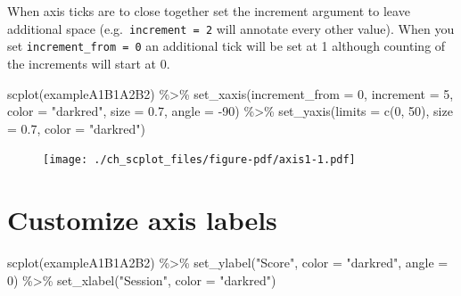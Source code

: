 \documentclass[
  letterpaper,
  DIV=11,
  numbers=noendperiod]{scrreprt}
\newenvironment{Shaded}{\begin{snugshade}}{\end{snugshade}}
\newcommand{\AttributeTok}[1]{\textcolor[rgb]{0.40,0.45,0.13}{#1}}
\newcommand{\DecValTok}[1]{\textcolor[rgb]{0.68,0.00,0.00}{#1}}
\newcommand{\FloatTok}[1]{\textcolor[rgb]{0.68,0.00,0.00}{#1}}
\newcommand{\FunctionTok}[1]{\textcolor[rgb]{0.28,0.35,0.67}{#1}}
\newcommand{\NormalTok}[1]{\textcolor[rgb]{0.00,0.23,0.31}{#1}}
\newcommand{\SpecialCharTok}[1]{\textcolor[rgb]{0.37,0.37,0.37}{#1}}
\newcommand{\StringTok}[1]{\textcolor[rgb]{0.13,0.47,0.30}{#1}}
\begin{document}
When axis ticks are to close together set the increment argument to
leave additional space (e.g.~\texttt{increment\ =\ 2} will annotate
every other value). When you set \texttt{increment\_from\ =\ 0} an
additional tick will be set at 1 although counting of the increments
will start at 0.

\begin{Shaded}
\begin{Highlighting}[]
\FunctionTok{scplot}\NormalTok{(exampleA1B1A2B2) }\SpecialCharTok{\%\textgreater{}\%} 
  \FunctionTok{set\_xaxis}\NormalTok{(}\AttributeTok{increment\_from =} \DecValTok{0}\NormalTok{, }\AttributeTok{increment =} \DecValTok{5}\NormalTok{, }
            \AttributeTok{color =} \StringTok{"darkred"}\NormalTok{, }\AttributeTok{size =} \FloatTok{0.7}\NormalTok{, }\AttributeTok{angle =} \SpecialCharTok{{-}}\DecValTok{90}\NormalTok{) }\SpecialCharTok{\%\textgreater{}\%}
  \FunctionTok{set\_yaxis}\NormalTok{(}\AttributeTok{limits =} \FunctionTok{c}\NormalTok{(}\DecValTok{0}\NormalTok{, }\DecValTok{50}\NormalTok{), }\AttributeTok{size =} \FloatTok{0.7}\NormalTok{, }\AttributeTok{color =} \StringTok{"darkred"}\NormalTok{) }
\end{Highlighting}
\end{Shaded}

\begin{figure}[H]

{\centering \texttt{[image: ./ch\_scplot\_files/figure-pdf/axis1-1.pdf]}

}

\end{figure}

\hypertarget{customize-axis-labels}{%
\section{Customize axis labels}\label{customize-axis-labels}}

\begin{Shaded}
\begin{Highlighting}[]
\FunctionTok{scplot}\NormalTok{(exampleA1B1A2B2) }\SpecialCharTok{\%\textgreater{}\%} 
  \FunctionTok{set\_ylabel}\NormalTok{(}\StringTok{"Score"}\NormalTok{, }\AttributeTok{color =} \StringTok{"darkred"}\NormalTok{, }\AttributeTok{angle =} \DecValTok{0}\NormalTok{) }\SpecialCharTok{\%\textgreater{}\%}
  \FunctionTok{set\_xlabel}\NormalTok{(}\StringTok{"Session"}\NormalTok{, }\AttributeTok{color =} \StringTok{"darkred"}\NormalTok{)}
\end{Highlighting}
\end{Shaded}
\end{document}
